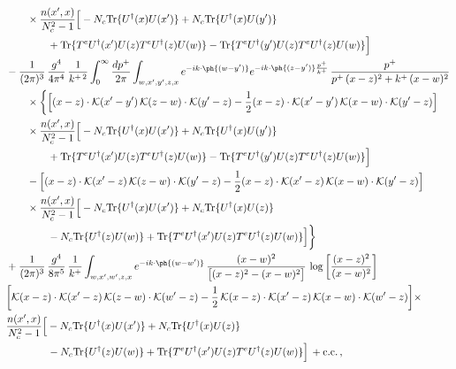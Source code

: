 \begin{align}
&\qquad\times\frac{n(x',x)}{N_{c}^{2}-1}\Big[-N_{c}{\rm Tr}\{U^{\dagger}(x)U(x')\}+N_{c}{\rm Tr}\{U^{\dagger}(x)U(y')\}\notag\\ &\qquad\qquad+{\rm Tr}\{T^{e}U^{\dagger}(x')U(z)T^{e}U^{\dagger}(z)U(w)\}-{\rm Tr}\{T^{e}U^{\dagger}(y')U(z)T^{e}U^{\dagger}(z)U(w)\}\Big]\notag\\
&-\frac{1}{(2\pi)^{3}}\,\frac{g^{4}}{4\pi^{4}}\,\frac{1}{k^{+\,2}}\int_{0}^{\infty}\frac{dp^{+}}{2\pi}\int_{w,x',y',z,x}e^{-ik\cdot\ph{(w-y')}}e^{-ik\cdot\ph{(z-y')}\frac{p^{+}}{k^{+}}}\,\frac{p^{+}}{p^{+}\,(x-z)^{2}+k^{+}\,(x-w)^{2}}\notag\\
&\qquad\times\bigg\{\Big[(x-z)\cdot\mathcal{K}(x'-y')\,\mathcal{K}(z-w)\cdot\mathcal{K}(y'-z)-\frac{1}{2}(x-z)\cdot\mathcal{K}(x'-y')\,\mathcal{K}(x-w)\cdot\mathcal{K}(y'-z)\Big]\notag\\
&\qquad\times\frac{n(x',x)}{N_{c}^{2}-1}\Big[-N_{c}{\rm Tr}\{U^{\dagger}(x)U(x')\}+N_{c}{\rm Tr}\{U^{\dagger}(x)U(y')\}\notag\\ &\qquad\qquad+{\rm Tr}\{T^{e}U^{\dagger}(x')U(z)T^{e}U^{\dagger}(z)U(w)\}-{\rm Tr}\{T^{e}U^{\dagger}(y')U(z)T^{e}U^{\dagger}(z)U(w)\}\Big]\notag\\
&\qquad-\Big[(x-z)\cdot\mathcal{K}(x'-z)\,\mathcal{K}(z-w)\cdot\mathcal{K}(y'-z)-\frac{1}{2}(x-z)\cdot\mathcal{K}(x'-z)\,\mathcal{K}(x-w)\cdot\mathcal{K}(y'-z)\Big]\notag\\
&\qquad\times\frac{n(x',x)}{N_{c}^{2}-1}\Big[-N_{c}{\rm Tr}\{U^{\dagger}(x)U(x')\}+N_{c}{\rm Tr}\{U^{\dagger}(x)U(z)\}\notag\\ &\qquad\qquad-N_{c}{\rm Tr}\{U^{\dagger}(z)U(w)\}+{\rm Tr}\{T^{e}U^{\dagger}(x')U(z)T^{e}U^{\dagger}(z)U(w)\}\Big]\bigg\}\notag\\
& +\frac{1}{(2\pi)^{3}}\,\frac{g^{4}}{8\pi^{5}}\,\frac{1}{k^{+}}\int_{w,x',w',z,x}e^{-ik\cdot\ph{(w-w')}}\,\frac{(x-w)^{2}}{\big[(x-z)^{2}-(x-w)^{2}\big]}\,\log\left[\frac{(x-z)^{2}}{(x-w)^{2}}\right]\notag \\ &  \bigg[\mathcal{K}(x-z)\cdot\mathcal{K}(x'-z)\,\mathcal{K}(z-w)\cdot\mathcal{K}(w'-z)-\frac{1}{2}\,\mathcal{K}(x-z)\cdot\mathcal{K}(x'-z)\,\mathcal{K}(x-w)\cdot\mathcal{K}(w'-z)\bigg]   \times\notag \\ & \frac{n(x',x)}{N_{c}^{2}-1}\Big[-N_{c}{\rm Tr}\{U^{\dagger}(x)U(x')\}+N_{c}{\rm Tr}\{U^{\dagger}(x)U(z)\}\notag\\ &\qquad\qquad-N_{c}{\rm Tr}\{U^{\dagger}(z)U(w)\}+{\rm Tr}\{T^{e}U^{\dagger}(x')U(z)T^{e}U^{\dagger}(z)U(w)\}\Big]\,+{\rm c.c.}\,,\label{eq:E-III.III-2o}
\end{align}
